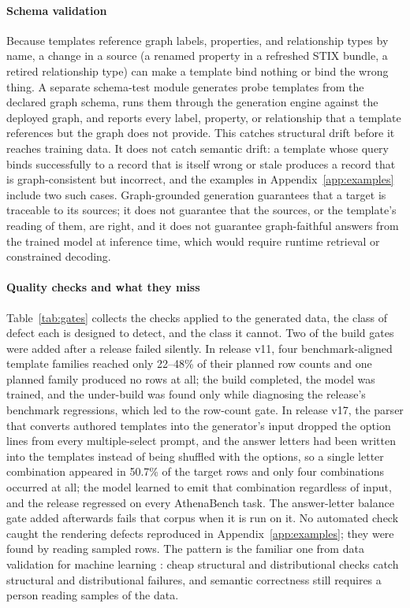 \documentclass[twocolumn]{svjour3}
\begin{document}
\paragraph{Schema validation}
Because templates reference graph labels, properties, and relationship types by name, a change in a source (a renamed property in a refreshed STIX bundle, a retired relationship type) can make a template bind nothing or bind the wrong thing. A separate schema-test module generates probe templates from the declared graph schema, runs them through the generation engine against the deployed graph, and reports every label, property, or relationship that a template references but the graph does not provide. This catches structural drift before it reaches training data. It does not catch semantic drift: a template whose query binds successfully to a record that is itself wrong or stale produces a record that is graph-consistent but incorrect, and the examples in Appendix~\ref{app:examples} include two such cases. Graph-grounded generation guarantees that a target is traceable to its sources; it does not guarantee that the sources, or the template's reading of them, are right, and it does not guarantee graph-faithful answers from the trained model at inference time, which would require runtime retrieval or constrained decoding.

\paragraph{Quality checks and what they miss}
Table~\ref{tab:gates} collects the checks applied to the generated data, the class of defect each is designed to detect, and the class it cannot. Two of the build gates were added after a release failed silently. In release v11, four benchmark-aligned template families reached only 22--48\% of their planned row counts and one planned family produced no rows at all; the build completed, the model was trained, and the under-build was found only while diagnosing the release's benchmark regressions, which led to the row-count gate. In release v17, the parser that converts authored templates into the generator's input dropped the option lines from every multiple-select prompt, and the answer letters had been written into the templates instead of being shuffled with the options, so a single letter combination appeared in 50.7\% of the target rows and only four combinations occurred at all; the model learned to emit that combination regardless of input, and the release regressed on every AthenaBench task. The answer-letter balance gate added afterwards fails that corpus when it is run on it. No automated check caught the rendering defects reproduced in Appendix~\ref{app:examples}; they were found by reading sampled rows. The pattern is the familiar one from data validation for machine learning \cite{breck2019datavalidation}: cheap structural and distributional checks catch structural and distributional failures, and semantic correctness still requires a person reading samples of the data.
\end{document}
